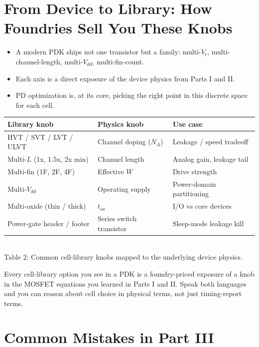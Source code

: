 \documentclass[11pt]{article}
\begin{document}
\section{From Device to Library: How Foundries Sell You These Knobs}

\begin{tldr}
\begin{itemize}[leftmargin=*]
\item A modern PDK ships not one transistor but a family: multi-$V_t$, multi-channel-length, multi-$V_{dd}$, multi-fin-count.
\item Each axis is a direct exposure of the device physics from Parts I and II.
\item PD optimization is, at its core, picking the right point in this discrete space for each cell.
\end{itemize}
\end{tldr}

\begin{center}
\begin{tabular}{lll}
\toprule
Library knob & Physics knob & Use case \\
\midrule
HVT / SVT / LVT / ULVT & Channel doping ($N_A$) & Leakage / speed tradeoff \\
Multi-$L$ (1x, 1.5x, 2x min) & Channel length & Analog gain, leakage tail \\
Multi-fin (1F, 2F, 4F) & Effective $W$ & Drive strength \\
Multi-$V_{dd}$ & Operating supply & Power-domain partitioning \\
Multi-oxide (thin / thick) & $t_{ox}$ & I/O vs core devices \\
Power-gate header / footer & Series switch transistor & Sleep-mode leakage kill \\
\bottomrule
\end{tabular}
\\
{\small Table 2: Common cell-library knobs mapped to the underlying device physics.}
\end{center}

\begin{checkpoint}
Every cell-library option you see in a PDK is a foundry-priced exposure of a knob in the MOSFET equations you learned in Parts I and II. Speak both languages and you can reason about cell choice in physical terms, not just timing-report terms.
\end{checkpoint}

\section{Common Mistakes in Part III}
\end{document}
